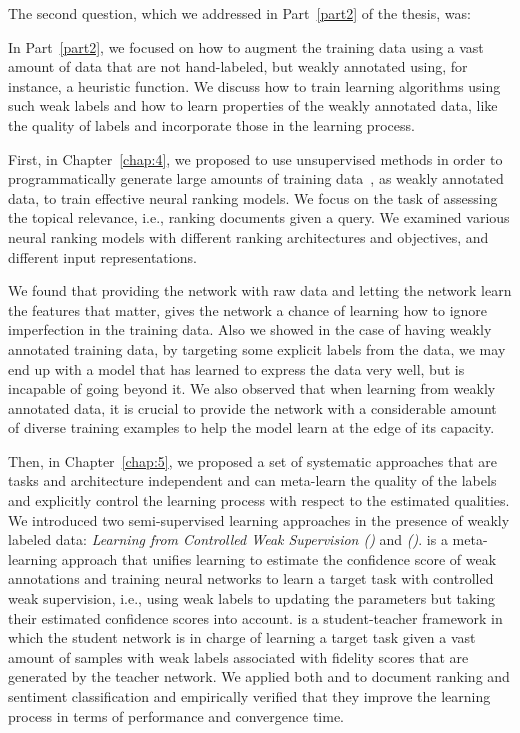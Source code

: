 \bigskip
The second question, which we addressed in Part~\ref{part2} of the thesis, was:
%

In Part~\ref{part2}, we focused on how to augment the training data using a vast amount of data that are not hand-labeled, but weakly annotated using, for instance, a heuristic function. We discuss how to train learning algorithms using such weak labels and how to learn properties of the weakly annotated data, like the quality of labels and incorporate those in the learning process.  

First, in Chapter~\ref{chap:4}, we proposed to use unsupervised methods in order to programmatically generate large amounts of training data~\citep{Ratner:2016}, as weakly annotated data, to train effective neural ranking models. We focus on the task of assessing the topical relevance, i.e., ranking documents given a query. We examined various neural ranking models with different ranking architectures and objectives, and different input representations.

We found that providing the network with raw data and letting the network learn the features that matter, gives the network a chance of learning how to ignore imperfection in the training data. Also we showed in the case of having weakly annotated training data, by targeting some explicit labels from the data, we may end up with a model that has learned to express the data very well, but is incapable of going beyond it. We also observed that when learning from weakly annotated data, it is crucial to provide the network with a considerable amount of diverse training examples to help the model learn at the edge of its capacity.

Then, in Chapter~\ref{chap:5}, we proposed a set of systematic approaches that are tasks and architecture independent and can meta-learn the quality of the labels and explicitly control the learning process with respect to the estimated qualities. We introduced two semi-supervised learning approaches in the presence of weakly labeled data: \emph{Learning from Controlled Weak Supervision (\cws)} and \emph{\fwlfulllc (\fwl)}.
\cws is a meta-learning approach that unifies learning to estimate the confidence score of weak annotations and training neural networks to learn a target task with controlled weak supervision, i.e., using weak labels to updating the parameters but taking their estimated confidence scores into account. \fwl is a student-teacher framework in which the student network is in charge of learning a target task given a vast amount of samples with weak labels associated with fidelity scores that are generated by the teacher network.  We applied both \cws and \fwl to document ranking and sentiment classification and empirically verified that they improve the learning process in terms of performance and convergence time. 

